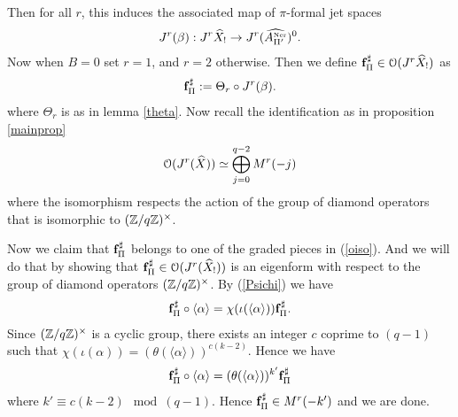 \documentclass{amsart}
\numberwithin{equation}{section}
\def \mb{\mbox}
\newcommand{\ner}{\mb{\tiny Ner}}
\begin{document}

Then for all $r$, this induces the associated map of $\pi$-formal jet spaces
\begin{align}
\label{beta2}
J^r(\beta) : J^r\ohat{X}_! \map J^r(\ohat{A_{\pip'}^{\ner}})^0.
\end{align}
Now when $B=0$ set $r=1$, and $r=2$ otherwise. Then 
we define ${\bold f}^\sharp_{{\tiny \Pi}} \in \mathcal{O}(J^r\widehat{X}_!)$ as 
\begin{align}
\label{fsharp}
{\bold f}^\sharp_{{\tiny \Pi}} := \Theta_r \circ J^r(\beta).
\end{align}
where $\Theta_r$ is as in lemma \ref{theta}.
Now recall the identification as in proposition \ref{mainprop}
\begin{align}
\label{oiso}
\mathcal{O}(J^r(\widehat{X})) \simeq \bigoplus_{j=0}^{q-2} M^r(-j)
\end{align}
where the isomorphism respects the action of the group of diamond operators
that is isomorphic to $(\mathbb{Z}/q\mathbb{Z})^\times$.

Now we claim that ${\bold f}^\sharp_{{\tiny \Pi}}$ belongs to one of the graded pieces in 
(\ref{oiso}). And we will do that by showing that ${\bold f}^\sharp_{{\tiny \Pi}} \in 
\mathcal{O}(J^r(\widehat{X}_!))$ is an eigenform with respect to the group of diamond 
operators $(\mathbb{Z}/q\mathbb{Z})^\times$. 
By (\ref{Psichi}) we have 
\begin{align}
{\bold f}^\sharp_{{\tiny \Pi}} \circ \langle \alpha \rangle = \chi(\iota(\langle\alpha \rangle)) 
{\bold f}^\sharp_{{\tiny \Pi}}.
\end{align}
Since $(\mathbb{Z}/q\mathbb{Z})^\times$ is a cyclic group, there exists an integer
 $c$ coprime to $(q-1)$ 
such that $\chi(\iota(\alpha)) = (\theta(\langle \alpha \rangle))^{c(k-2)}$. 
Hence we have 
\begin{align}
{\bold f}^\sharp_{{\tiny \Pi}} \circ \langle \alpha \rangle = 
(\theta(\langle \alpha \rangle))^{k'} {\bold f}^\sharp_{{\tiny \Pi}}
\end{align}
where $k' \equiv c(k-2) \mod (q-1)$. Hence ${\bold f}^\sharp_{{\tiny \Pi}} \in M^r(-k')$ and we 
are done.


%

\end{document}
